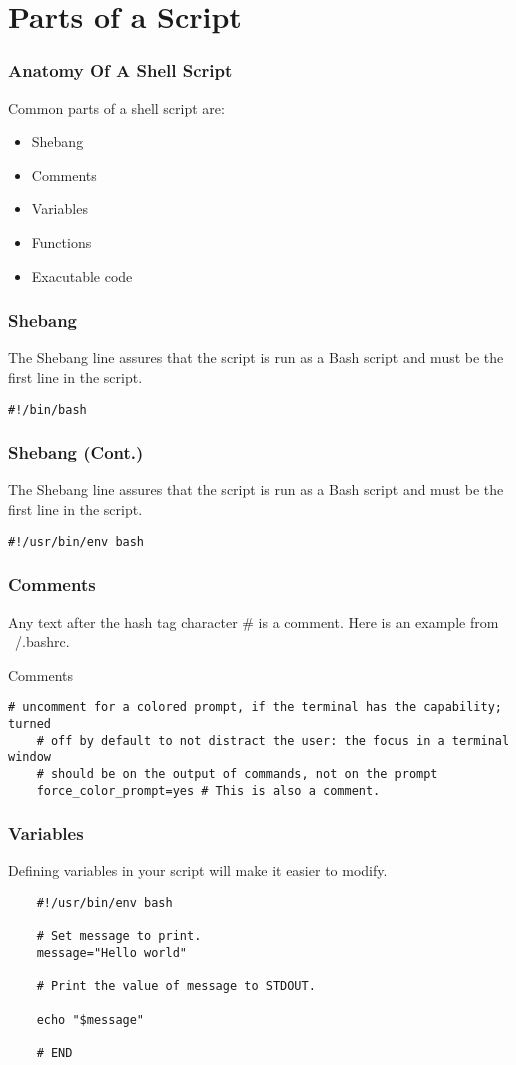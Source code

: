 \documentclass[handout]{beamer}
\begin{document}
\section{Parts of a Script}

\begin{frame}
  \frametitle{Anatomy Of A Shell Script}
  Common parts of a shell script are:
  \begin{itemize}
  \item Shebang
  \item Comments
  \item Variables
  \item Functions
  \item Exacutable code
  \end{itemize}
\end{frame}
\begin{frame}[fragile]
  \frametitle{Shebang}
  The Shebang line assures that the script is run as a Bash script and must be the first line in the script.
\begin{block}{}
\begin{verbatim}
#!/bin/bash
\end{verbatim}
\end{block}
\end{frame}
\begin{frame}[fragile]
  \frametitle{Shebang (Cont.)}
  The Shebang line assures that the script is run as a Bash script and must be the first line in the script.
\begin{block}{}
\begin{verbatim}
#!/usr/bin/env bash
\end{verbatim}
\end{block}
\end{frame}
\begin{frame}[fragile]
  \frametitle{Comments}
  Any text after the hash tag character \# is a comment. Here is an example from ~/.bashrc.
\begin{block}{Comments}
\begin{verbatim}
# uncomment for a colored prompt, if the terminal has the capability; turned
	# off by default to not distract the user: the focus in a terminal window
	# should be on the output of commands, not on the prompt
	force_color_prompt=yes # This is also a comment.
\end{verbatim}
\end{block}
\end{frame}
\begin{frame}[fragile]
  \frametitle{Variables}
  Defining variables in your script will make it easier to modify.
\begin{block}{}
  \begin{verbatim}
	#!/usr/bin/env bash

	# Set message to print.
	message="Hello world"

	# Print the value of message to STDOUT.

	echo "$message"

	# END
  \end{verbatim}
\end{block}
\end{frame}
\end{document}
